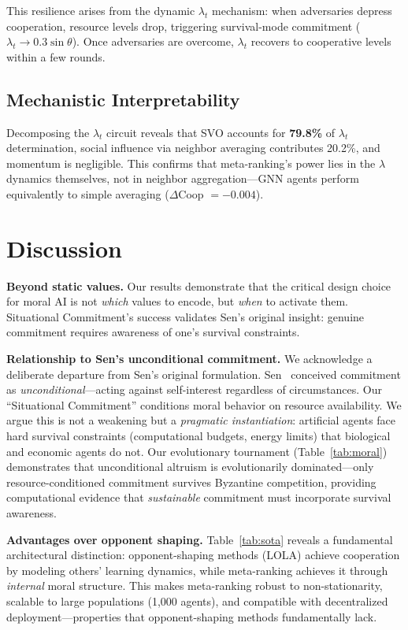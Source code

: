 \documentclass{article}
\begin{document}
This resilience arises from the dynamic $\lambda_t$ mechanism: when adversaries depress cooperation, resource levels drop, triggering survival-mode commitment ($\lambda_t \to 0.3\sin\theta$). Once adversaries are overcome, $\lambda_t$ recovers to cooperative levels within a few rounds.

\subsection{Mechanistic Interpretability}

Decomposing the $\lambda_t$ circuit reveals that SVO accounts for \textbf{79.8\%} of $\lambda_t$ determination, social influence via neighbor averaging contributes 20.2\%, and momentum is negligible. This confirms that meta-ranking's power lies in the $\lambda$ dynamics themselves, not in neighbor aggregation---GNN agents perform equivalently to simple averaging ($\Delta$Coop $= -0.004$).

\section{Discussion}

\textbf{Beyond static values.} Our results demonstrate that the critical design choice for moral AI is not \textit{which} values to encode, but \textit{when} to activate them. Situational Commitment's success validates Sen's original insight: genuine commitment requires awareness of one's survival constraints.

\textbf{Relationship to Sen's unconditional commitment.} We acknowledge a deliberate departure from Sen's original formulation. Sen~\cite{sen1977rational} conceived commitment as \textit{unconditional}---acting against self-interest regardless of circumstances. Our ``Situational Commitment'' conditions moral behavior on resource availability. We argue this is not a weakening but a \textit{pragmatic instantiation}: artificial agents face hard survival constraints (computational budgets, energy limits) that biological and economic agents do not. Our evolutionary tournament (Table~\ref{tab:moral}) demonstrates that unconditional altruism is evolutionarily dominated---only resource-conditioned commitment survives Byzantine competition, providing computational evidence that \textit{sustainable} commitment must incorporate survival awareness.

\textbf{Advantages over opponent shaping.} Table~\ref{tab:sota} reveals a fundamental architectural distinction: opponent-shaping methods (LOLA) achieve cooperation by modeling others' learning dynamics, while meta-ranking achieves it through \textit{internal} moral structure. This makes meta-ranking robust to non-stationarity, scalable to large populations (1,000 agents), and compatible with decentralized deployment---properties that opponent-shaping methods fundamentally lack.
\end{document}
